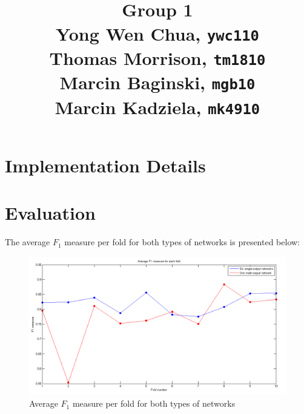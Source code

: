 \documentclass[a4paper]{article}
\title{
\vspace{2in}
\textmd{\textbf{\hmwkTitle}}\\
\vspace{3in}
\textbf{Group 1}\\
Yong Wen Chua, \texttt{ywc110}\\
Thomas Morrison, \texttt{tm1810}\\
Marcin Baginski, \texttt{mgb10}\\
Marcin Kadziela, \texttt{mk4910}
}
\date{} %
\begin{document}
\maketitle



\newpage
\tableofcontents
\newpage


\section{Implementation Details}


\clearpage


\section{Evaluation}
The average $F_1$ measure per fold for both types of networks is presented below:
\begin{figure}[H]
\center
\includegraphics[width=0.9\columnwidth]{averageF1eachFold}
\caption{Average $F_1$ measure per fold for both types of networks}
\end{figure}
\end{document}
